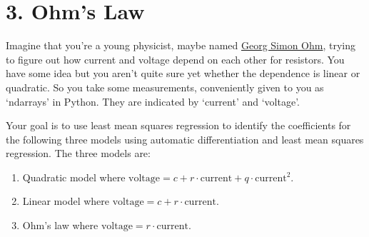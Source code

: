 \documentclass[11pt]{article}
\providecommand{\tightlist}{%
      \setlength{\itemsep}{0pt}\setlength{\parskip}{0pt}}
\begin{document}
    \hypertarget{ohms-law}{%
\section{3. Ohm's Law}\label{ohms-law}}

Imagine that you're a young physicist, maybe named
\href{https://en.wikipedia.org/wiki/Georg_Ohm}{Georg Simon Ohm}, trying
to figure out how current and voltage depend on each other for
resistors. You have some idea but you aren't quite sure yet whether the
dependence is linear or quadratic. So you take some measurements,
conveniently given to you as `ndarrays' in Python. They are indicated by
`current' and `voltage'.

Your goal is to use least mean squares regression to identify the
coefficients for the following three models using automatic
differentiation and least mean squares regression. The three models are:

\begin{enumerate}
\def\labelenumi{\arabic{enumi}.}
\tightlist
\item
  Quadratic model where
  \(\mathrm{voltage} = c + r \cdot \mathrm{current} + q \cdot \mathrm{current}^2\).
\item
  Linear model where
  \(\mathrm{voltage} = c + r \cdot \mathrm{current}\).
\item
  Ohm's law where \(\mathrm{voltage} = r \cdot \mathrm{current}\).
\end{enumerate}
\end{document}
